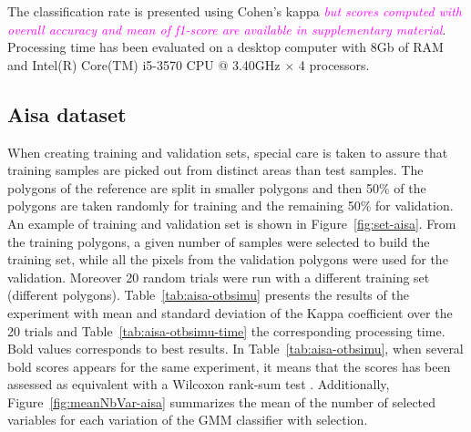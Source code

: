 \documentclass[journal,10pt]{IEEEtran}
\newcommand{\rev}[1]{\textcolor{magenta}{\emph{#1}}}
\begin{document}
    The    classification   rate    is    presented   using    Cohen's
    kappa \rev{but scores computed with overall accuracy and mean of f1-score are available in supplementary material}. Processing  time has been  evaluated on a  desktop computer
    with  8Gb of  RAM  and  Intel(R) Core(TM)  i5-3570  CPU @  3.40GHz
    $\times$ 4 processors.

    \subsection{Aisa dataset}
    \label{sec:aisa}

    When creating training and validation  sets, special care is taken
    to assure that training samples are picked out from distinct areas
    than test  samples.  The  polygons of the  reference are  split in
    smaller polygons and then 50\%  of the polygons are taken randomly
    for training and the remaining 50\% for validation.  An example of
    training      and     validation      set     is      shown     in
    Figure~\ref{fig:set-aisa}.  From the  training  polygons, a  given
    number of samples  were selected to build the  training set, while
    all  the pixels  from the  validation polygons  were used  for the
    validation.  Moreover 20  random trials were run  with a different
    training  set (different  polygons).  Table~\ref{tab:aisa-otbsimu}
    presents  the results  of the  experiment with  mean and  standard
    deviation  of  the  Kappa  coefficient  over  the  20  trials  and
    Table~\ref{tab:aisa-otbsimu-time}  the   corresponding  processing
    time. Bold values corresponds to best results. In Table~\ref{tab:aisa-otbsimu}, when several bold scores appears for the same experiment, it means that the scores has been assessed as equivalent with a Wilcoxon rank-sum test \cite{mann1947test}. Additionally, Figure~\ref{fig:meanNbVar-aisa} summarizes the mean of the number of selected variables for each variation of the GMM classifier with selection.
\end{document}
